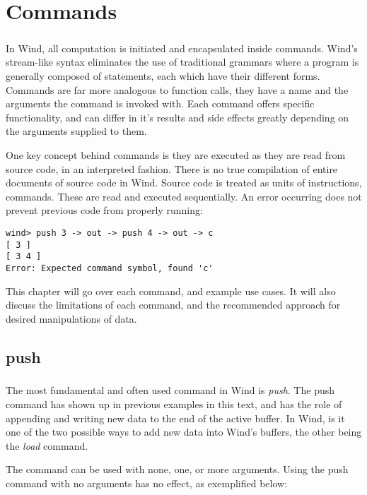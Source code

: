
\chapter{Commands}

\paragraph{  } In Wind, all computation is initiated and encapsulated inside commands. Wind's stream-like syntax eliminates the use of traditional grammars where a program is generally composed of statements, each which have their different forms. Commands are far more analogous to function calls, they have a name and the arguments the command is invoked with. Each command offers specific functionality, and can differ in it's results and side effects greatly depending on the arguments supplied to them. 
\par One key concept behind commands is they are executed as they are read from source code, in an interpreted fashion. There is no true compilation of entire documents of source code in Wind. Source code is treated as units of instructions, commands. These are read and executed sequentially. An error occurring does not prevent previous code from properly running:

\begin{verbatim}
wind> push 3 -> out -> push 4 -> out -> c
[ 3 ]
[ 3 4 ]
Error: Expected command symbol, found 'c'
\end{verbatim}

\par This chapter will go over each command, and example use cases. It will also discuss the limitations of each command, and the recommended approach for desired manipulations of data.

\section{push}

\paragraph{  } The most fundamental and often used command in Wind is \emph{push}. The push command has shown up in previous examples in this text, and has the role of appending and writing new data to the end of the active buffer. In Wind, is it one of the two possible ways to add new data into Wind's buffers, the other being the \emph{load} command.
\par The command can be used with none, one, or more arguments. Using the push command with no arguments has no effect, as exemplified below:

